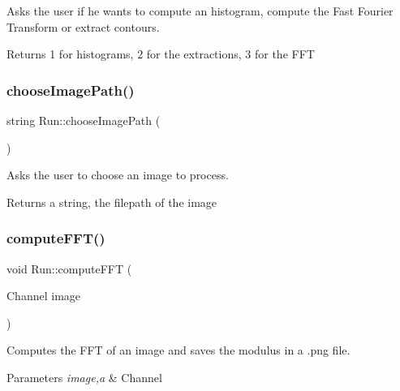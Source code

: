 Asks the user if he wants to compute an histogram, compute the Fast Fourier Transform or extract contours. 

\begin{DoxyReturn}{Returns}
1 for histograms, 2 for the extractions, 3 for the F\+FT 
\end{DoxyReturn}
\mbox{\label{class_run_aa5f70a3b468b1fc5eeb06e5300d6fdb2}} 
\subsubsection{\texorpdfstring{choose\+Image\+Path()}{chooseImagePath()}}
{\footnotesize\ttfamily string Run\+::choose\+Image\+Path (\begin{DoxyParamCaption}{ }\end{DoxyParamCaption})}



Asks the user to choose an image to process. 

\begin{DoxyReturn}{Returns}
a string, the filepath of the image 
\end{DoxyReturn}
\mbox{\label{class_run_a32a683ef3c55139cc3f62ceab409d2eb}} 
\subsubsection{\texorpdfstring{compute\+F\+F\+T()}{computeFFT()}}
{\footnotesize\ttfamily void Run\+::compute\+F\+FT (\begin{DoxyParamCaption}\item[{Channel}]{image }\end{DoxyParamCaption})}



Computes the F\+FT of an image and saves the modulus in a .png file. 


\begin{DoxyParams}{Parameters}
{\em image,a} & Channel \\
\hline
\end{DoxyParams}
\mbox{\label{class_run_a2442d8d1adf860040ddbdbe0280c3a37}} 
